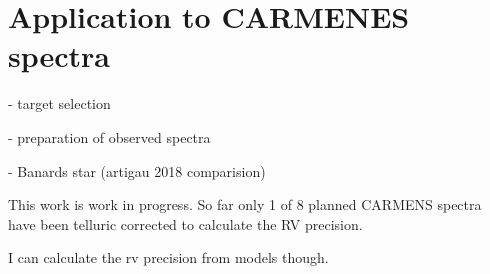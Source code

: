 \section{Application to CARMENES spectra}

- target selection

- preparation of observed spectra

- Banards star (artigau 2018 comparision)


This work is work in progress.
So far only 1 of 8 planned CARMENS spectra have been telluric corrected to calculate the RV precision.

{I can calculate the rv precision from models though.}
